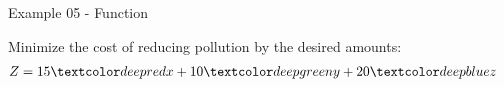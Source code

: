 \begin{frame}{Example 05 - Function}

Minimize the cost of reducing pollution by the desired amounts:
\begin{align*}
    Z &= 15\colora{x} + 10\colorb{y} + 20\colorc{z}
\end{align*}

\end{frame}
